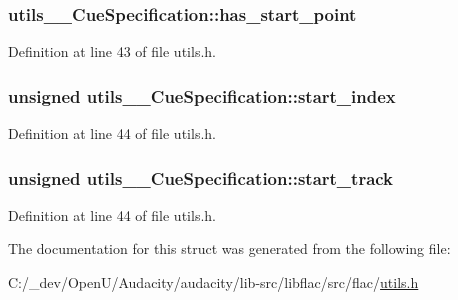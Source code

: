 \subsubsection[{\texorpdfstring{has\+\_\+start\+\_\+point}{has_start_point}}]{ utils\+\_\+\+\_\+\+Cue\+Specification\+::has\+\_\+start\+\_\+point}\hypertarget{structutils_____cue_specification_a1db538512a5cf1bbef062aa67778b1a6}{}\label{structutils_____cue_specification_a1db538512a5cf1bbef062aa67778b1a6}


Definition at line 43 of file utils.\+h.

\subsubsection[{\texorpdfstring{start\+\_\+index}{start_index}}]{\setlength{\rightskip}{0pt plus 5cm}unsigned utils\+\_\+\+\_\+\+Cue\+Specification\+::start\+\_\+index}\hypertarget{structutils_____cue_specification_ad564653c495af6d5fcf87f0d0ab1df5e}{}\label{structutils_____cue_specification_ad564653c495af6d5fcf87f0d0ab1df5e}


Definition at line 44 of file utils.\+h.

\subsubsection[{\texorpdfstring{start\+\_\+track}{start_track}}]{\setlength{\rightskip}{0pt plus 5cm}unsigned utils\+\_\+\+\_\+\+Cue\+Specification\+::start\+\_\+track}\hypertarget{structutils_____cue_specification_ac5ce7cc8b30333cfeb3306534ba6ea51}{}\label{structutils_____cue_specification_ac5ce7cc8b30333cfeb3306534ba6ea51}


Definition at line 44 of file utils.\+h.



The documentation for this struct was generated from the following file\+:\begin{DoxyCompactItemize}
\item 
C\+:/\+\_\+dev/\+Open\+U/\+Audacity/audacity/lib-\/src/libflac/src/flac/\hyperlink{libflac_2src_2flac_2utils_8h}{utils.\+h}\end{DoxyCompactItemize}
